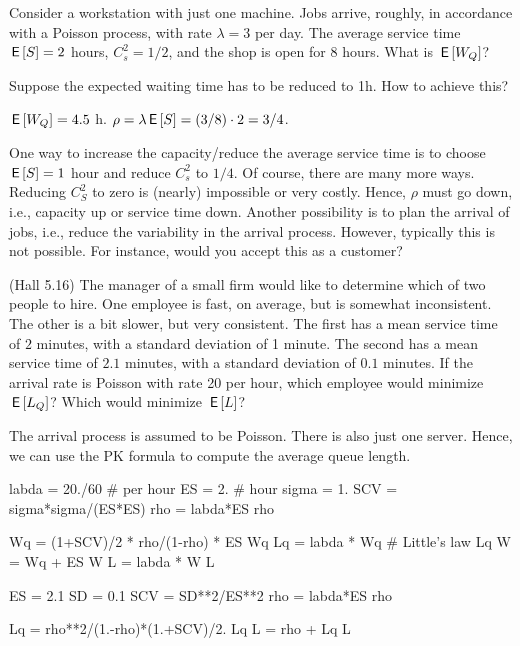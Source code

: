\begin{exercise}[\faPhoto]
  Consider a workstation with just one machine. Jobs arrive, roughly,
  in accordance with a Poisson process, with rate $\lambda=3$ per day. The
  average service time $\,\mathsf{E}\left[S\right] = 2$ hours, $C^2_s = 1/2$, and the shop
  is open for 8 hours. What is $\,\mathsf{E}\left[W_Q\right]$?

 Suppose the expected waiting time has to be reduced to 1h. How
  to achieve this? 
\begin{solution}
  $\,\mathsf{E}\left[W_Q\right] = 4.5$ h. $\rho = \lambda \,\mathsf{E}\left[S\right] = (3/8)\cdot 2 = 3/4$.

 One way to increase the capacity/reduce the average service
    time is to choose $\,\mathsf{E}\left[S\right] =1$ hour and reduce $C^2_s$ to $1/4$.  Of
    course, there are many more ways. Reducing $C^2_S$ to zero is
    (nearly) impossible or very costly. Hence, $\rho$ must go down,
    i.e., capacity up or service time down. Another possibility is to
    plan the arrival of jobs, i.e., reduce the variability in the
    arrival process. However, typically this is not possible. For
    instance, would you accept this as a customer?
\end{solution}
\end{exercise}


\begin{exercise}{\faPhoto}
  (Hall 5.16) The manager of a small firm would like to determine
  which of two people to hire. One employee is fast, on average, but
  is somewhat inconsistent. The other is a bit slower, but very
  consistent. The first has a mean service time of $2$ minutes, with a
  standard deviation of 1 minute. The second has a mean service time
  of $2.1$ minutes, with a standard deviation of $0.1$ minutes. If the arrival rate is Poisson with rate 20 per hour, which employee would minimize $\,\mathsf{E}\left[L_Q\right]$? Which would minimize $\,\mathsf{E}\left[L\right]$? 
  \begin{solution}
    The arrival process is assumed to be Poisson. There is also
    just one server. Hence, we can use the PK formula to compute the average queue length.

\begin{pyconsole}
labda = 20./60 # per hour
ES = 2. # hour
sigma = 1.
SCV = sigma*sigma/(ES*ES)
rho = labda*ES
rho

Wq = (1+SCV)/2 * rho/(1-rho) * ES
Wq
Lq = labda * Wq # Little's law
Lq
W = Wq + ES
W
L = labda * W
L
\end{pyconsole}


\begin{pyconsole}
ES = 2.1
SD = 0.1
SCV = SD**2/ES**2
rho = labda*ES
rho

Lq = rho**2/(1.-rho)*(1.+SCV)/2.
Lq
L = rho + Lq
L
\end{pyconsole}

  \end{solution}
\end{exercise}


